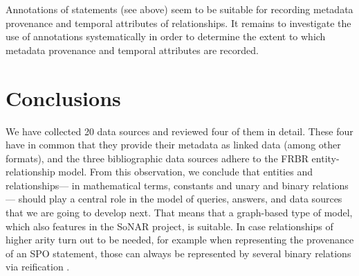 Annotations of statements (see above) seem to be suitable for 
recording metadata provenance and temporal attributes of relationships.
It remains to investigate the use of annotations systematically
in order to determine the extent to which metadata provenance and temporal attributes
are recorded.

%

%

\section{Conclusions}
\label{sec:implications_on_modelling}

We have collected 20 data sources and reviewed four of them in detail.
These four have in common that they provide their metadata as linked data (among other formats),
and the three bibliographic data sources adhere to the FRBR entity-relationship model.
From this observation, we conclude that entities and relationships---%
in mathematical terms, constants and unary and binary relations---%
should play a central role in the model of queries, answers, and data sources
that we are going to develop next. That means that a graph-based type of model,
which also features in the \gls{SoNAR} project,
is suitable. In case relationships of higher arity turn out to be needed,
for example when representing the  provenance of an \gls{SPO} statement,
those can always be represented by several binary relations via reification
\autocite[cf.][p.339f.]{Doan2012}.


